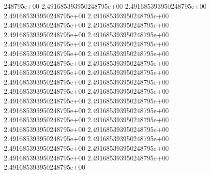 248795e+00	2.491685393950248795e+00	2.491685393950248795e+00	2.491685393950248795e+00	2.491685393950248795e+00	2.491685393950248795e+00	2.491685393950248795e+00	2.491685393950248795e+00	2.491685393950248795e+00	2.491685393950248795e+00	2.491685393950248795e+00	2.491685393950248795e+00	2.491685393950248795e+00	2.491685393950248795e+00	2.491685393950248795e+00	2.491685393950248795e+00	2.491685393950248795e+00	2.491685393950248795e+00	2.491685393950248795e+00	2.491685393950248795e+00	2.491685393950248795e+00	2.491685393950248795e+00	2.491685393950248795e+00	2.491685393950248795e+00	2.491685393950248795e+00	2.491685393950248795e+00	2.491685393950248795e+00	2.491685393950248795e+00	2.491685393950248795e+00	2.491685393950248795e+00	2.491685393950248795e+00	2.491685393950248795e+00	2.491685393950248795e+00	2.491685393950248795e+00	2.491685393950248795e+00	2.491685393950248795e+00

